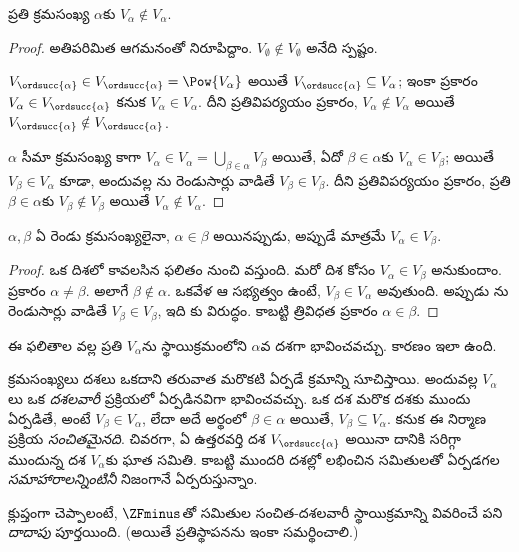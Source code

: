\documentclass[../../../include/open-logic-section]{subfiles}
\begin{document}
\begin{lem}
ప్రతి క్రమసంఖ్య $\alpha$కు $V_\alpha \notin V_\alpha$.
\end{lem}

\begin{proof}
అతిపరిమిత ఆగమనంతో నిరూపిద్దాం. $V_\emptyset \notin V_\emptyset$ అనేది స్పష్టం.

$V_{\ordsucc{\alpha}} \in V_{\ordsucc{\alpha}} = \Pow{V_\alpha}$ అయితే $V_{\ordsucc{\alpha}} \subseteq V_\alpha$; ఇంకా  ప్రకారం $V_\alpha \in V_{\ordsucc{\alpha}}$ కనుక $V_\alpha \in V_\alpha$. దీని ప్రతివిపర్యయం ప్రకారం, $V_\alpha \notin V_\alpha$ అయితే $V_{\ordsucc{\alpha}} \notin V_{\ordsucc{\alpha}}$.

$\alpha$ సీమా క్రమసంఖ్య కాగా $V_\alpha \in V_\alpha = \bigcup_{\beta \in
\alpha}V_\beta$ అయితే, ఏదో $\beta \in \alpha$కు $V_\alpha \in V_\beta$; అయితే $V_\beta \in V_\alpha$ కూడా, అందువల్ల ను రెండుసార్లు వాడితే $V_\beta \in V_\beta$. దీని ప్రతివిపర్యయం ప్రకారం, ప్రతి $\beta \in \alpha$కు $V_\beta \notin V_\beta$ అయితే $V_\alpha \notin V_\alpha$.
\end{proof}

\begin{cor}
$\alpha, \beta$ ఏ రెండు క్రమసంఖ్యలైనా, $\alpha \in \beta$
అయినప్పుడు, అప్పుడే మాత్రమే $V_\alpha \in V_\beta$.
\end{cor}

\begin{proof}
ఒక దిశలో కావలసిన ఫలితం  నుంచి వస్తుంది.
మరో దిశ కోసం $V_\alpha \in V_\beta$ అనుకుందాం.
 ప్రకారం $\alpha \neq \beta$.
అలాగే $\beta \notin \alpha$. ఒకవేళ ఆ సభ్యత్వం ఉంటే,
$V_\beta \in V_\alpha$ అవుతుంది. అప్పుడు
ను రెండుసార్లు వాడితే $V_\beta \in V_\beta$,
ఇది కు విరుద్ధం.
కాబట్టి త్రివిధత ప్రకారం $\alpha \in \beta$.
\end{proof}
\noindent
ఈ ఫలితాల వల్ల ప్రతి $V_\alpha$ను స్థాయిక్రమంలోని $\alpha$వ దశగా
భావించవచ్చు. కారణం ఇలా ఉంది.

క్రమసంఖ్యలు దశలు ఒకదాని తరువాత మరొకటి ఏర్పడే క్రమాన్ని
సూచిస్తాయి. అందువల్ల $V_\alpha$లు ఒక \emph{దశలవారీ}
ప్రక్రియలో ఏర్పడినవిగా భావించవచ్చు. ఒక దశ మరొక దశకు ముందు
ఏర్పడితే, అంటే $V_\beta \in V_\alpha$, లేదా అదే అర్థంలో
$\beta \in \alpha$ అయితే, $V_\beta \subseteq V_\alpha$. కనుక
ఈ నిర్మాణ ప్రక్రియ \emph{సంచితమైనది}. చివరగా, ఏ ఉత్తరవర్తి
దశ $V_{\ordsucc{\alpha}}$ అయినా దానికి సరిగ్గా ముందున్న దశ $V_\alpha$కు
ఘాత సమితి. కాబట్టి ముందరి దశల్లో లభించిన సమితులతో ఏర్పడగల
\emph{సమాహారాలన్నింటినీ} నిజంగానే ఏర్పరుస్తున్నాం.

క్లుప్తంగా చెప్పాలంటే, $\ZFminus$తో సమితుల సంచిత-దశలవారీ
స్థాయిక్రమాన్ని వివరించే పని \emph{దాదాపు} పూర్తయింది.
(అయితే ప్రతిస్థాపనను ఇంకా సమర్థించాలి.)
\end{document}
